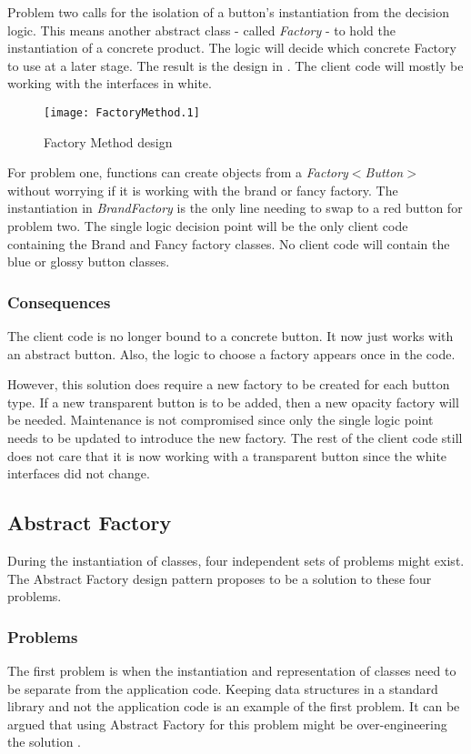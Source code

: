 Problem two calls for the isolation of a button's instantiation from the decision logic.
This means another abstract class - called \textit{Factory} - to hold the instantiation of a concrete product.
The logic will decide which concrete Factory to use at a later stage.
The result is the design in .
The client code will mostly be working with the interfaces in white.

\begin{figure}[h]
	\centering
	\texttt{[image: FactoryMethod.1]}
	\caption{Factory Method design}
	\label{fig:FactoryMethod}
\end{figure}

For problem one, functions can create objects from a \textit{Factory$<$Button$>$} without worrying if it is working with the brand or fancy factory.
The instantiation in \textit{BrandFactory} is the only line needing to swap to a red button for problem two.
The single logic decision point will be the only client code containing the Brand and Fancy factory classes.
No client code will contain the blue or glossy button classes.

\subsubsection{Consequences}
The client code is no longer bound to a concrete button.
It now just works with an abstract button.
Also, the logic to choose a factory appears once in the code.

However, this solution does require a new factory to be created for each button type.
If a new transparent button is to be added, then a new opacity factory will be needed.
Maintenance is not compromised since only the single logic point needs to be updated to introduce the new factory.
The rest of the client code still does not care that it is now working with a transparent button since the white interfaces did not change.

\subsection{Abstract Factory}
During the instantiation of classes, four independent sets of problems might exist.
The Abstract Factory design pattern proposes to be a solution to these four problems. \cite{gamma_94_01}

\subsubsection{Problems}
The first problem is when the instantiation and representation of classes need to be separate from the application code.
Keeping data structures in a standard library and not the application code is an example of the first problem.
It can be argued that using Abstract Factory for this problem might be over-engineering the solution \cite{kerievsky_05_01}.

